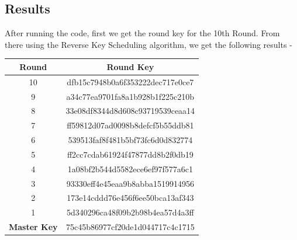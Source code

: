 \documentclass{article}
\begin{document}
\subsection{Results}
After running the code, first we get the round key for the 10th Round. From there using the Reverse Key Scheduling algorithm, we get the following results - 

\begin{table}[H]
	\begin{tabular}{|c|c|}
		\hline 
		\textbf{Round} & \textbf{Round Key} \\ \hline 

10 & dfb15c7948b0a6f353222dec717e0ce7 \\ \hline
9 & a34c77ea9701fa8a1b928b1f225c210b \\ \hline
8 & 33e08df8344d8d608c93719539ceaa14 \\ \hline
7 & ff59812d07ad0098b8defcf5b55ddb81 \\ \hline
6 & 539513faf8f481b5bf73fc6d0d832774 \\ \hline
5 & ff2cc7cdab61924f47877dd8b2f0db19 \\ \hline
4 & 1a08bf2b544d5582ece6ef97f577a6c1 \\ \hline
3 & 93330eff4e45eaa9b8abba1519914956 \\ \hline
2 & 173e14cddd76e456f6ee50bca13af343 \\ \hline
1 & 5d340296ca48f09b2b98b4ea57d4a3ff \\ \hline \hline 
\textbf{Master Key} & 75c45b86977cf20de1d044717c4c1715 \\ \hline
	\end{tabular}
\end{table}
\end{document}
